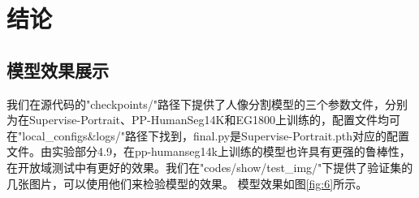 \documentclass[11pt]{article}
\begin{document}
\section{结论}
\subsection{模型效果展示}
我们在源代码的"checkpoints/"路径下提供了人像分割模型的三个参数文件，分别为在Supervise-Portrait、PP-HumanSeg14K和EG1800上训练的，配置文件均可在"local_configs\&logs/"路径下找到，final.py是Supervise-Portrait.pth对应的配置文件。由实验部分4.9，在pp-humanseg14k上训练的模型也许具有更强的鲁棒性，在开放域测试中有更好的效果。我们在"codes/show/test_img/"下提供了验证集的几张图片，可以使用他们来检验模型的效果。
模型效果如图\ref{fig:6}所示。
\begin{figure}[!h]
  \centering
\end{figure}
\end{document}
